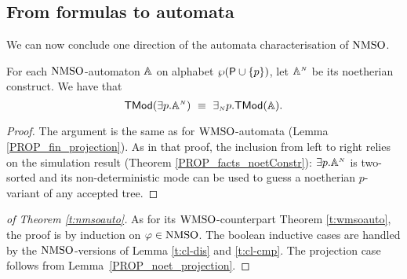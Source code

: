 \subsection{From formulas to automata}

We can now conclude one direction of the automata characterisation of $\mathrm{NMSO}$.

\begin{lemma}\label{PROP_noet_projection}
For each $\mathrm{NMSO}$-automaton $\mathbb{A}$ on alphabet $\wp (\mathsf{P} \cup \{p\})$, let $\mathbb{A}^{{\scriptscriptstyle N}}$ be its noetherian construct.
We have that
$$\mathsf{TMod}({{\exists} p}.\mathbb{A}^{{\scriptscriptstyle N}}) \ \equiv\
{{\exists_{{\scriptscriptstyle N}}} p}.\mathsf{TMod}(\mathbb{A}).
$$
\end{lemma}
\begin{proof} The argument is the same as for $\mathrm{WMSO}$-automata (Lemma \ref{PROP_fin_projection}). As in that proof, the inclusion from left to right relies on the simulation result (Theorem \ref{PROP_facts_noetConstr}): ${{\exists} p}.\mathbb{A}^{{\scriptscriptstyle N}}$ is two-sorted and its non-deterministic mode can be used to guess a noetherian $p$-variant of any accepted tree. \end{proof}

\begin{proof}[of Theorem \ref{t:nmsoauto}] As for its $\mathrm{WMSO}$-counterpart Theorem \ref{t:wmsoauto}, the proof is by induction on $\varphi \in \mathrm{NMSO}$. The boolean inductive cases are handled by the $\mathrm{NMSO}$-versions of Lemma \ref{t:cl-dis} and \ref{t:cl-cmp}. The projection case follows from Lemma~\ref{PROP_noet_projection}.
\end{proof}

